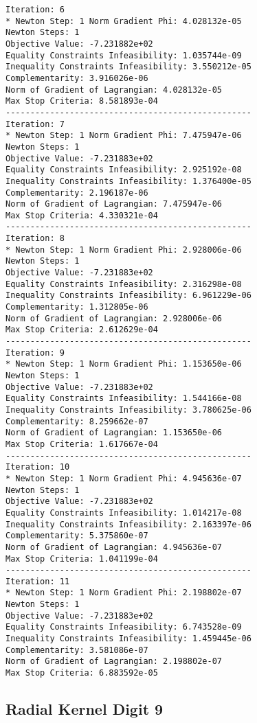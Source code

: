 \documentclass{article}
\begin{document}
\begin{minipage}[t]{0.45\textwidth}
\begin{verbatim}
Iteration: 6
* Newton Step: 1 Norm Gradient Phi: 4.028132e-05
Newton Steps: 1
Objective Value: -7.231882e+02
Equality Constraints Infeasibility: 1.035744e-09
Inequality Constraints Infeasibility: 3.550212e-05
Complementarity: 3.916026e-06
Norm of Gradient of Lagrangian: 4.028132e-05
Max Stop Criteria: 8.581893e-04
--------------------------------------------------
Iteration: 7
* Newton Step: 1 Norm Gradient Phi: 7.475947e-06
Newton Steps: 1
Objective Value: -7.231883e+02
Equality Constraints Infeasibility: 2.925192e-08
Inequality Constraints Infeasibility: 1.376400e-05
Complementarity: 2.196187e-06
Norm of Gradient of Lagrangian: 7.475947e-06
Max Stop Criteria: 4.330321e-04
--------------------------------------------------
Iteration: 8
* Newton Step: 1 Norm Gradient Phi: 2.928006e-06
Newton Steps: 1
Objective Value: -7.231883e+02
Equality Constraints Infeasibility: 2.316298e-08
Inequality Constraints Infeasibility: 6.961229e-06
Complementarity: 1.312805e-06
Norm of Gradient of Lagrangian: 2.928006e-06
Max Stop Criteria: 2.612629e-04
--------------------------------------------------
Iteration: 9
* Newton Step: 1 Norm Gradient Phi: 1.153650e-06
Newton Steps: 1
Objective Value: -7.231883e+02
Equality Constraints Infeasibility: 1.544166e-08
Inequality Constraints Infeasibility: 3.780625e-06
Complementarity: 8.259662e-07
Norm of Gradient of Lagrangian: 1.153650e-06
Max Stop Criteria: 1.617667e-04
--------------------------------------------------
Iteration: 10
* Newton Step: 1 Norm Gradient Phi: 4.945636e-07
Newton Steps: 1
Objective Value: -7.231883e+02
Equality Constraints Infeasibility: 1.014217e-08
Inequality Constraints Infeasibility: 2.163397e-06
Complementarity: 5.375860e-07
Norm of Gradient of Lagrangian: 4.945636e-07
Max Stop Criteria: 1.041199e-04
--------------------------------------------------
Iteration: 11
* Newton Step: 1 Norm Gradient Phi: 2.198802e-07
Newton Steps: 1
Objective Value: -7.231883e+02
Equality Constraints Infeasibility: 6.743528e-09
Inequality Constraints Infeasibility: 1.459445e-06
Complementarity: 3.581086e-07
Norm of Gradient of Lagrangian: 2.198802e-07
Max Stop Criteria: 6.883592e-05
\end{verbatim}
\end{minipage}

\subsection{Radial Kernel Digit 9}\label{radial9}
\end{document}
